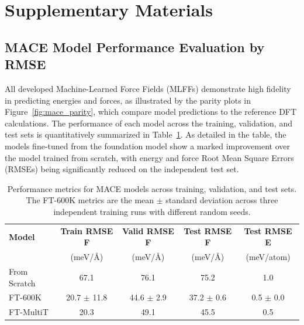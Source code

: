 \documentclass[pdflatex,sn-mathphys-num]{sn-jnl}%
\theoremstyle{thmstyleone}%
\theoremstyle{thmstyletwo}%
\theoremstyle{thmstylethree}%
\begin{document}




\section{Supplementary Materials}
\subsection{MACE Model Performance Evaluation by RMSE}

All developed Machine-Learned Force Fields (MLFFs) demonstrate high fidelity in predicting energies and forces, as illustrated by the parity plots in Figure~\ref{fig:mace_parity}, which compare model predictions to the reference DFT calculations. The performance of each model across the training, validation, and test sets is quantitatively summarized in Table~\ref{tab:mace_performance_detailed}. As detailed in the table, the models fine-tuned from the foundation model show a marked improvement over the model trained from scratch, with energy and force Root Mean Square Errors (RMSEs) being significantly reduced on the independent test set.

\begin{table}[htbp]
    \centering
    \caption{Performance metrics for MACE models across training, validation, and test sets. The FT-600K metrics are the mean $\pm$ standard deviation across three independent training runs with different random seeds.}
    \label{tab:mace_performance_detailed}
    \begin{tabular}{lcccc}
        \toprule
        \textbf{Model} & \textbf{Train RMSE F} & \textbf{Valid RMSE F} & \textbf{Test RMSE F} & \textbf{Test RMSE E} \\
         & (meV/\AA) & (meV/\AA) & (meV/\AA) & (meV/atom) \\
        \midrule
        From Scratch & 67.1 & 76.1 & 75.2 & 1.0 \\
        FT-600K & 20.7 $\pm$ 11.8 & 44.6 $\pm$ 2.9 & 37.2 $\pm$ 0.6 & 0.5 $\pm$ 0.0 \\
        FT-MultiT & 20.3 & 49.1 & 45.5 & 0.5 \\
        \bottomrule
    \end{tabular}
\end{table}
\end{document}
